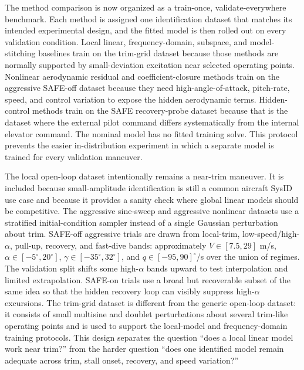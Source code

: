 \documentclass[11pt]{article}
\begin{document}
The method comparison is now organized as a train-once, validate-everywhere
benchmark. Each method is assigned one identification dataset that matches its
intended experimental design, and the fitted model is then rolled out on every
validation condition. Local linear, frequency-domain, subspace, and
model-stitching baselines train on the trim-grid dataset because those methods
are normally supported by small-deviation excitation near selected operating
points. Nonlinear aerodynamic residual and coefficient-closure methods train on
the aggressive SAFE-off dataset because they need high-angle-of-attack,
pitch-rate, speed, and control variation to expose the hidden aerodynamic
terms. Hidden-control methods train on the SAFE recovery-probe dataset because
that is the dataset where the external pilot command differs systematically
from the internal elevator command. The nominal model has no fitted training
solve. This protocol prevents the easier in-distribution experiment in which a
separate model is trained for every validation maneuver.

The local open-loop dataset intentionally remains a near-trim maneuver. It is
included because small-amplitude identification is still a common aircraft
SysID use case and because it provides a sanity check where global linear
models should be competitive. The aggressive sine-sweep and aggressive
nonlinear datasets use a stratified initial-condition sampler instead of a
single Gaussian perturbation about trim. SAFE-off aggressive trials are drawn
from local-trim, low-speed/high-$\alpha$, pull-up, recovery, and fast-dive
bands: approximately $V\in[7.5,29]$ m/s,
$\alpha\in[-5^\circ,20^\circ]$, $\gamma\in[-35^\circ,32^\circ]$, and
$q\in[-95,90]^\circ$/s over the union of regimes. The validation split shifts
some high-$\alpha$ bands upward to test interpolation and limited
extrapolation. SAFE-on trials use a broad but recoverable subset of the same
idea so that the hidden recovery loop can visibly suppress high-$\alpha$
excursions. The trim-grid dataset is different from the generic open-loop
dataset: it consists of small multisine and doublet perturbations about several
trim-like operating points and is used to support the local-model and
frequency-domain training protocols. This design separates the question ``does
a local linear model work near trim?'' from the harder question ``does one
identified model remain adequate across trim, stall onset, recovery, and speed
variation?''
\end{document}

